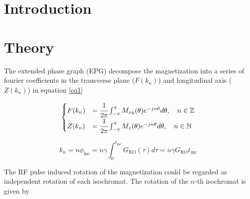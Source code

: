 \documentclass[AMA,STIX2COL,Linenumberson]{MRM}
\begin{document}



\maketitle


\section{Introduction}\label{sec_intro}

\section{Theory}\label{sec_thoery}

The extended phase graph (EPG) \cite{weigel2015extended} decompose the magnetization into a series of fourier coefficients in the transverse plane ($F(k_n)$) and longitudinal axis ($Z(k_n)$) in equation \ref{eq1}

\begin{equation}
  \begin{cases}
    F(k_n)&= \cfrac{1}{2\pi} \int_{-\pi}^{\pi} M_{xy}(\theta) e^{-jn\theta} d\theta, \quad n \in \mathbb{Z}\\
    Z(k_n)&= \cfrac{1}{2\pi} \int_{-\pi}^{\pi} M_z(\theta) e^{-jn\theta} d\theta, \quad n \in \mathbb{N}\\
  \end{cases}
\label{eq1}
\end{equation}


\begin{equation}
  k_n=n\phi_{\text{inc}} = n\gamma\int_0^{t_{\text{inc}}}G_\text{RO}(\tau)d\tau = n\gamma G_\text{RO}t_\text{inc}
\label{eq2}
\end{equation}

The RF pulse induced rotation of the magnetization could be regarded as independent rotation of each isochromat. The rotation of the $n$-th isochromat is given by
\end{document}
